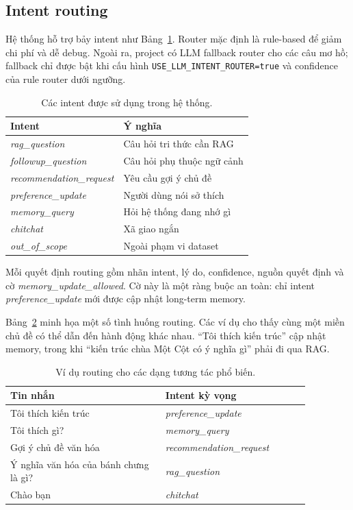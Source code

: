 \documentclass[11pt]{article}
\begin{document}
\subsection{Intent routing}

Hệ thống hỗ trợ bảy intent như Bảng~\ref{tab:intents}. Router mặc định là rule-based để giảm chi phí và dễ debug. Ngoài ra, project có LLM fallback router cho các câu mơ hồ; fallback chỉ được bật khi cấu hình \texttt{USE\_LLM\_INTENT\_ROUTER=true} và confidence của rule router dưới ngưỡng.

\begin{table}[t]
\centering
\small
\begin{tabular}{ll}
\toprule
\textbf{Intent} & \textbf{Ý nghĩa} \\
\midrule
\textit{rag\_question} & Câu hỏi tri thức cần RAG \\
\textit{followup\_question} & Câu hỏi phụ thuộc ngữ cảnh \\
\textit{recommendation\_request} & Yêu cầu gợi ý chủ đề \\
\textit{preference\_update} & Người dùng nói sở thích \\
\textit{memory\_query} & Hỏi hệ thống đang nhớ gì \\
\textit{chitchat} & Xã giao ngắn \\
\textit{out\_of\_scope} & Ngoài phạm vi dataset \\
\bottomrule
\end{tabular}
\caption{Các intent được sử dụng trong hệ thống.}
\label{tab:intents}
\end{table}

Mỗi quyết định routing gồm nhãn intent, lý do, confidence, nguồn quyết định và cờ \textit{memory\_update\_allowed}. Cờ này là một ràng buộc an toàn: chỉ intent \textit{preference\_update} mới được cập nhật long-term memory.

Bảng~\ref{tab:route-examples} minh họa một số tình huống routing. Các ví dụ cho thấy cùng một miền chủ đề có thể dẫn đến hành động khác nhau. ``Tôi thích kiến trúc'' cập nhật memory, trong khi ``kiến trúc chùa Một Cột có ý nghĩa gì'' phải đi qua RAG.

\begin{table}[t]
\centering
\small
\begin{tabular}{p{0.45\linewidth}p{0.42\linewidth}}
\toprule
\textbf{Tin nhắn} & \textbf{Intent kỳ vọng} \\
\midrule
Tôi thích kiến trúc & \textit{preference\_update} \\
Tôi thích gì? & \textit{memory\_query} \\
Gợi ý chủ đề văn hóa & \textit{recommendation\_request} \\
Ý nghĩa văn hóa của bánh chưng là gì? & \textit{rag\_question} \\
Chào bạn & \textit{chitchat} \\
\bottomrule
\end{tabular}
\caption{Ví dụ routing cho các dạng tương tác phổ biến.}
\label{tab:route-examples}
\end{table}
\end{document}
